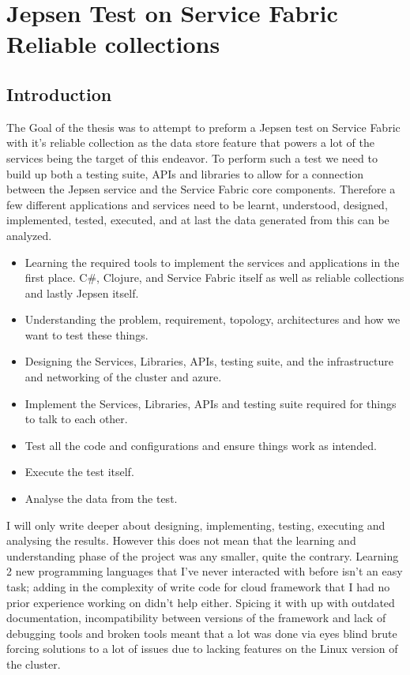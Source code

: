 \documentclass[a4paper,10pt,titlepage]{report}
\begin{document}
    \chapter{Jepsen Test on Service Fabric Reliable collections}


    \section{Introduction}

    The Goal of the thesis was to attempt to preform a Jepsen test on Service Fabric with it's reliable collection as the data store feature that powers a lot of the services being the target of this endeavor. To perform such a test we need to build up both a testing suite, APIs and libraries to allow for a connection between the Jepsen service and the Service Fabric core components. Therefore a few different applications and services need to be learnt, understood, designed, implemented, tested, executed, and at last the data generated from this can be analyzed.
    \begin{itemize}
        \item Learning the required tools to implement the services and applications in the first place. C\#, Clojure, and Service Fabric itself as well as reliable collections and lastly Jepsen itself.
        \item Understanding the problem, requirement, topology, architectures and how we want to test these things.
        \item Designing the Services, Libraries, APIs, testing suite, and the infrastructure and networking of the cluster and azure.
        \item Implement the Services, Libraries, APIs and testing suite required for things to talk to each other.
        \item Test all the code and configurations and ensure things work as intended.
        \item Execute the test itself.
        \item Analyse the data from the test.
    \end{itemize}

    I will only write deeper about designing, implementing, testing, executing and analysing the results. However this does not mean that the learning and understanding phase of the project was any smaller, quite the contrary. Learning 2 new programming languages that I've never interacted with before isn't an easy task; adding in the complexity of write code for cloud framework that I had no prior experience working on didn't help either. Spicing it with up with outdated documentation, incompatibility between versions of the framework and lack of debugging tools and broken tools meant that a lot was done via eyes blind brute forcing solutions to a lot of issues due to lacking features on the Linux version of the cluster.\\
\end{document}
